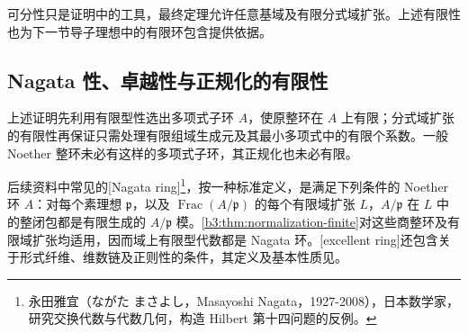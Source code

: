 可分性只是证明中的工具，最终定理允许任意基域及有限分式域扩张。上述有限性也为下一节导子理想中的有限环包含提供依据。

\subsection{Nagata 性、卓越性与正规化的有限性}\label{b3:subsec:0605:06}
\label{b3:subsec:0604:05}

上述证明先利用有限型性选出多项式子环 \(A\)，使原整环在 \(A\) 上有限；分式域扩张的有限性再保证只需处理有限组域生成元及其最小多项式中的有限个系数。一般 Noether 整环未必有这样的多项式子环，其正规化也未必有限。

\ProseParagraphBreak
后续资料中常见的[Nagata ring]\footnote{永田雅宜（ながた まさよし，Masayoshi Nagata，1927-2008），日本数学家，研究交换代数与代数几何，构造 Hilbert 第十四问题的反例。}，按一种标准定义，是满足下列条件的 Noether 环 \(A\)：对每个素理想 \(\mathfrak p\)，以及 \(\operatorname{Frac}(A/\mathfrak p)\) 的每个有限域扩张 \(L\)，\(A/\mathfrak p\) 在 \(L\) 中的整闭包都是有限生成的 \(A/\mathfrak p\) 模。\cref{b3:thm:normalization-finite}对这些商整环及有限域扩张均适用，因而域上有限型代数都是 Nagata 环。[excellent ring]还包含关于形式纤维、维数链及正则性的条件，其定义及基本性质见。
